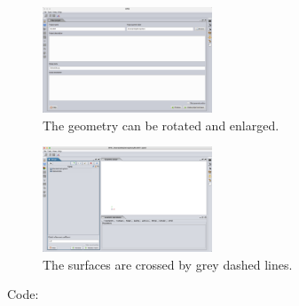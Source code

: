 \documentclass[a4paper, 11pt]{article}
\begin{document}
\begin{figure}[!ht]
    \centering
    \includegraphics[width=0.45\textwidth]{fig9.jpg}
    \caption{The geometry can be rotated and enlarged.}
\end{figure}

\begin{figure}[!ht]
    \centering
    \includegraphics[width=0.45\textwidth]{fig10.jpg}
    \caption{The surfaces are crossed by grey dashed lines.}
\end{figure}

Code:
\end{document}
